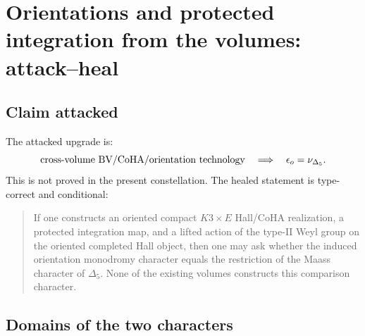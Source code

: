 \section{Orientations and protected integration from the volumes: attack--heal}
\label{sec:orientations-protected-integration-from-volumes-attack-heal}

\providecommand{\Z}{\mathbb Z}
\providecommand{\C}{\mathbb C}
\providecommand{\La}{\Lambda}
\providecommand{\RPerf}{\operatorname{RPerf}}
\providecommand{\RHom}{\operatorname{RHom}}
\providecommand{\sdet}{\operatorname{sdet}}
\providecommand{\CoHA}{\operatorname{CoHA}}
\providecommand{\Hall}{\mathcal H}
\providecommand{\Prim}{\operatorname{Prim}}
\providecommand{\Ran}{\operatorname{Ran}}
\providecommand{\hCS}{\mathrm{hCS}}
\providecommand{\BV}{\mathrm{BV}}
\providecommand{\TS}{\mathrm{TS}}
\providecommand{\nuDelta}{\nu_{\Delta_5}}
\providecommand{\epsor}{\epsilon_o}
\providecommand{\autcor}{\mathfrak g_{\Delta_5}}

\subsection{Claim attacked}

The attacked upgrade is:
\[
\hbox{cross-volume BV/CoHA/orientation technology}
\quad\Longrightarrow\quad
\epsor=\nuDelta .
\]
This is not proved in the present constellation.  The healed statement is
type-correct and conditional:

\begin{quote}
If one constructs an oriented compact \(K3\times E\) Hall/CoHA
realization, a protected integration map, and a lifted action of the
type-II Weyl group on the oriented completed Hall object, then one may ask
whether the induced orientation monodromy character equals the
restriction of the Maass character of \(\Delta_5\).  None of the existing
volumes constructs this comparison character.
\end{quote}

\subsection{Domains of the two characters}


